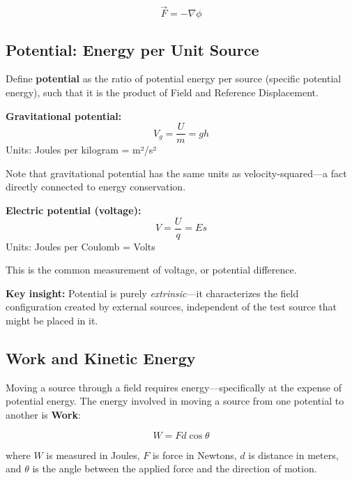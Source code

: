 \documentclass[
  letterpaper,
  DIV=11,
  numbers=noendperiod]{scrartcl}
\begin{document}
\[\vec{F} = -\nabla\phi\]

\subsection{Potential: Energy per Unit
Source}\label{potential-energy-per-unit-source}

Define \textbf{potential} as the ratio of potential energy per source
(specific potential energy), such that it is the product of Field and
Reference Displacement.

\textbf{Gravitational potential:} \[V_g = \frac{U}{m} = gh\] Units:
Joules per kilogram = m²/s²

Note that gravitational potential has the same units as
velocity-squared---a fact directly connected to energy conservation.

\textbf{Electric potential (voltage):} \[V = \frac{U}{q} = Es\] Units:
Joules per Coulomb = Volts

This is the common measurement of voltage, or potential difference.

\begin{tcolorbox}[enhanced jigsaw, title=\textcolor{quarto-callout-important-color}{\faExclamation}\hspace{0.5em}{Important}, breakable, left=2mm, opacitybacktitle=0.6, rightrule=.15mm, opacityback=0, toptitle=1mm, bottomrule=.15mm, arc=.35mm, leftrule=.75mm, colbacktitle=quarto-callout-important-color!10!white, toprule=.15mm, colframe=quarto-callout-important-color-frame, bottomtitle=1mm, titlerule=0mm, colback=white, coltitle=black]

\textbf{Key insight:} Potential is purely \emph{extrinsic}---it
characterizes the field configuration created by external sources,
independent of the test source that might be placed in it.

\end{tcolorbox}

\subsection{Work and Kinetic Energy}\label{work-and-kinetic-energy}

Moving a source through a field requires energy---specifically at the
expense of potential energy. The energy involved in moving a source from
one potential to another is \textbf{Work}:

\[W = Fd\cos\theta\]

where \(W\) is measured in Joules, \(F\) is force in Newtons, \(d\) is
distance in meters, and \(\theta\) is the angle between the applied
force and the direction of motion.
\end{document}
